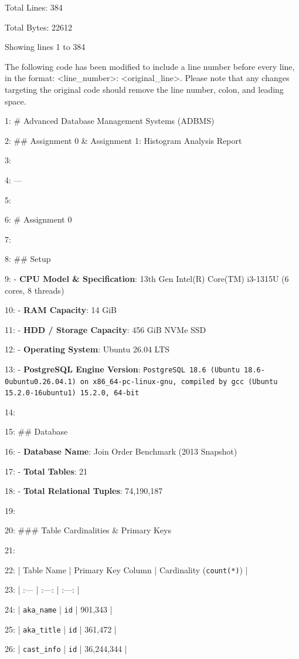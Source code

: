 \documentclass[11pt,a4paper]{article}
\begin{document}
{Total Lines: 384

Total Bytes: 22612

Showing lines 1 to 384

The following code has been modified to include a line number before every line, in the format: <line\_number>: <original\_line>. Please note that any changes targeting the original code should remove the line number, colon, and leading space.

1: \# Advanced Database Management Systems (ADBMS)

2: \#\# Assignment 0 \& Assignment 1: Histogram Analysis Report

3:

4: ---

5:

6: \# Assignment 0

7:

8: \#\# Setup

9: - \textbf{CPU Model \& Specification}: 13th Gen Intel(R) Core(TM) i3-1315U (6 cores, 8 threads)

10: - \textbf{RAM Capacity}: 14 GiB

11: - \textbf{HDD / Storage Capacity}: 456 GiB NVMe SSD

12: - \textbf{Operating System}: Ubuntu 26.04 LTS

13: - \textbf{PostgreSQL Engine Version}: \texttt{PostgreSQL 18.6 (Ubuntu 18.6-0ubuntu0.26.04.1) on x86\_64-pc-linux-gnu, compiled by gcc (Ubuntu 15.2.0-16ubuntu1) 15.2.0, 64-bit}

14:

15: \#\# Database

16: - \textbf{Database Name}: Join Order Benchmark (2013 Snapshot)

17: - \textbf{Total Tables}: 21

18: - \textbf{Total Relational Tuples}: 74,190,187

19:

20: \#\#\# Table Cardinalities \& Primary Keys

21:

22: | Table Name | Primary Key Column | Cardinality (\texttt{count(*)}) |

23: | :--- | :---: | :---: |

24: | \texttt{aka\_name} | \texttt{id} | 901,343 |

25: | \texttt{aka\_title} | \texttt{id} | 361,472 |

26: | \texttt{cast\_info} | \texttt{id} | 36,244,344 |

}
\end{document}
